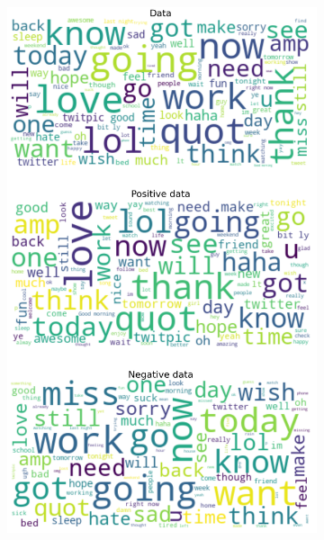 \documentclass{article}
\begin{document}
\begin{itemize}
\begin{figure}[H]
\centering
\captionsetup{justification=centering}
\begin{subfigure}[b]{0.24\textwidth}
\centering
\includegraphics[width=\textwidth]{chapter-06/section-01-01/08/visualization/1/wordcloud.png}
\end{subfigure}
\begin{subfigure}[b]{0.24\textwidth}
\centering

\end{subfigure}
\end{figure}
\end{itemize}
\end{document}
